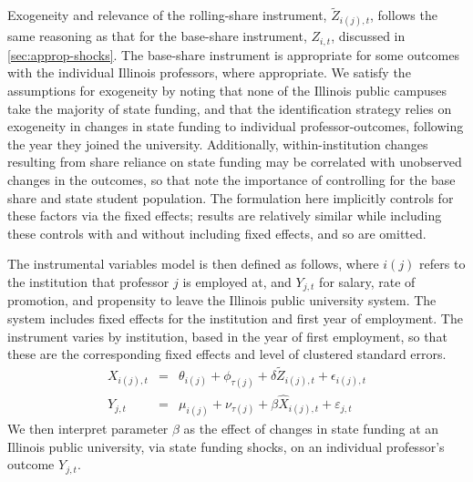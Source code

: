 Exogeneity and relevance of the rolling-share instrument, $\tilde Z_{i(j),t}$, follows the same reasoning as that for the base-share instrument, $Z_{i,t}$, discussed in \autoref{sec:approp-shocks}.
The base-share instrument is appropriate for some outcomes with the individual Illinois professors, where appropriate.
We satisfy the assumptions for exogeneity by noting that none of the Illinois public campuses take the majority of state funding, and that the identification strategy relies on exogeneity in changes in state funding to individual professor-outcomes, following the year they joined the university.
Additionally, within-institution changes resulting from share reliance on state funding may be correlated with unobserved changes in the outcomes, so that \cite{NBERw27885} note the importance of controlling for the base share and state student population.
The formulation here implicitly controls for these factors via the fixed effects; results are relatively similar while including these controls with and without including fixed effects, and so are omitted.

The instrumental variables model is then defined as follows, where $i(j)$ refers to the institution that professor $j$ is employed at, and $Y_{j,t}$ for salary, rate of promotion, and propensity to leave the Illinois public university system.
The system includes fixed effects for the institution and first year of employment.
The instrument varies by institution, based in the year of first employment, so that these are the corresponding fixed effects and level of clustered standard errors.
\begin{eqnarray}
    \label{eqn:secondstage1_indiv}
    X_{i(j),t} &=& \theta_{i(j)} + \phi_{\tau(j)} + \delta \tilde Z_{i(j),t} + \epsilon_{i(j),t} \\
    \label{eqn:secondstage2_indiv}
    Y_{j,t} &=& \mu_{i(j)} + \nu_{\tau(j)} + \beta \widehat X_{i(j),t} + \varepsilon_{j,t}
\end{eqnarray}
We then interpret parameter $\beta$ as the effect of changes in state funding at an Illinois public university, via state funding shocks, on an individual professor's outcome $Y_{j,t}$.

